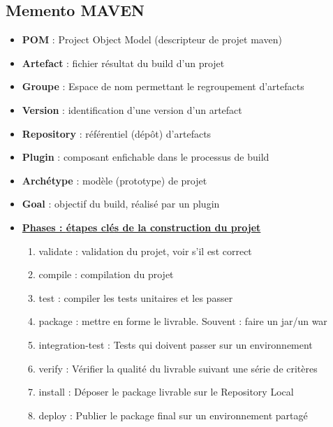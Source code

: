 \documentclass[11pt,twoside,a4paper]{article}
\begin{document}
\begin{landscape}
\begin{multicols}{2}
	\vfill
	
	\columnbreak
	
	\section*{Memento MAVEN}
	
	\begin{itemize}
		\item \textbf{POM} : Project Object Model (descripteur de projet maven)
		\item \textbf{Artefact} : fichier r{\'e}sultat du build d'un projet
		\item \textbf{Groupe} : Espace de nom permettant le regroupement d'artefacts
		\item \textbf{Version} : identification d'une version d'un artefact
		\item \textbf{Repository} : r{\'e}f{\'e}rentiel (d{\'e}p{\^o}t) d'artefacts
		\item \textbf{Plugin} : composant enfichable dans le processus de build
		\item \textbf{Arch{\'e}type} : mod{\`e}le (prototype) de projet
		\item \textbf{Goal} : objectif du build, r{\'e}alis{\'e} par un plugin
		\item \underline{\textbf{Phases : {\'e}tapes cl{\'e}s de la construction du projet}}
		\begin{enumerate}
			\item \textsf{validate} : validation du projet, voir s'il est correct
			\item \textsf{compile} : compilation du projet
			\item \textsf{test} : compiler les tests unitaires et les passer
			\item \textsf{package} : mettre en forme le livrable. Souvent : faire un jar/un war
			\item \textsf{integration-test} : Tests qui doivent passer sur un environnement
			\item \textsf{verify} : V{\'e}rifier la qualit{\'e} du livrable suivant une s{\'e}rie de crit{\`e}res
			\item \textsf{install} : D{\'e}poser le package livrable sur le Repository Local
			\item \textsf{deploy} : Publier le package final sur un environnement partag{\'e}
		\end{enumerate}

\end{itemize}
\end{multicols}
\end{landscape}
\end{document}

